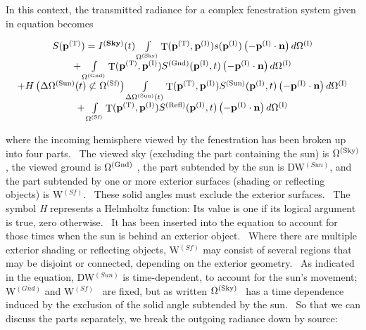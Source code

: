 In this context, the transmitted radiance for a complex fenestration system given in equation becomes

\begin{equation}
\begin{array}{c}S({{\bf{p}}^{{\rm{(T)}}}}) = {I^{({\bf{Sky}})}}(t)\int\limits_{{\Omega ^{{\rm{(Sky)}}}}} {{\mathop{\rm T}\nolimits} ({{\bf{p}}^{{\rm{(T)}}}},{{\bf{p}}^{{\rm{(I)}}}})s({{\bf{p}}^{{\rm{(I)}}}})\left( { - {{\bf{p}}^{{\rm{(I)}}}}\cdot {\bf{n}}} \right)d{\Omega ^{{\rm{(I)}}}}} \\ + \int\limits_{{\Omega ^{{\rm{(Gnd)}}}}} {{\mathop{\rm T}\nolimits} ({{\bf{p}}^{{\rm{(T)}}}},{{\bf{p}}^{{\rm{(I)}}}}){S^{{\rm{(Gnd)}}}}({{\bf{p}}^{{\rm{(I)}}}},t)\left( { - {{\bf{p}}^{{\rm{(I)}}}}\cdot {\bf{n}}} \right)d{\Omega ^{{\rm{(I)}}}}} \\ + H\left( {\Delta {\Omega ^{{\rm{(Sun)}}}}(t) \not\subset {\Omega ^{{\rm{(Sf)}}}}} \right)\int\limits_{\Delta {\Omega ^{{\rm{(Sun)}}}}(t)} {{\mathop{\rm T}\nolimits} ({{\bf{p}}^{{\rm{(T)}}}},{{\bf{p}}^{{\rm{(I)}}}}){S^{{\rm{(Sun)}}}}({{\bf{p}}^{{\rm{(I)}}}},t)\left( { - {{\bf{p}}^{{\rm{(I)}}}}\cdot {\bf{n}}} \right)d{\Omega ^{{\rm{(I)}}}}} \\ + \int\limits_{{\Omega ^{{\rm{(Sf)}}}}} {{\mathop{\rm T}\nolimits} ({{\bf{p}}^{{\rm{(T)}}}},{{\bf{p}}^{{\rm{(I)}}}}){S^{{\rm{(Refl)}}}}({{\bf{p}}^{{\rm{(I)}}}},t)\left( { - {{\bf{p}}^{{\rm{(I)}}}}\cdot {\bf{n}}} \right)d{\Omega ^{{\rm{(I)}}}}} \end{array}
\end{equation}

where the incoming hemisphere viewed by the fenestration has been broken up into four parts.~ The viewed sky (excluding the part containing the sun) is \({\Omega ^{{\rm{(Sky)}}}}\) , the viewed ground is \({\Omega ^{{\rm{(Gnd)}}}}\) , the part subtended by the sun is DW\(^{(Sun)}\), and the part subtended by one or more exterior surfaces (shading or reflecting objects) is W\(^{(Sf)}\).~ These solid angles must exclude the exterior surfaces.~ The symbol \emph{H} represents a Helmholtz function: Its value is one if its logical argument is true, zero otherwise.~ It has been inserted into the equation to account for those times when the sun is behind an exterior object.~ Where there are multiple exterior shading or reflecting objects, W\(^{(Sf)}\) may consist of several regions that may be disjoint or connected, depending on the exterior geometry.~ As indicated in the equation, DW\(^{(Sun)}\) is time-dependent, to account for the sun's movement; W\(^{(Gnd)}\) and W\(^{(Sf)}\)~ are fixed, but as written \({\Omega ^{{\rm{(Sky)}}}}\) ~has a time dependence induced by the exclusion of the solid angle subtended by the sun.~ So that we can discuss the parts separately, we break the outgoing radiance down by source:


